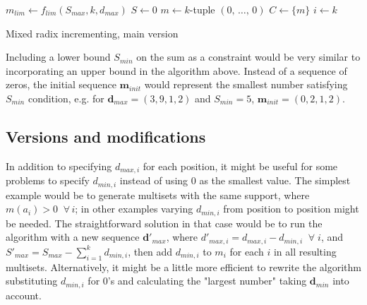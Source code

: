 \documentclass[11pt]{article}
\begin{document}
\begin{algorithm}[H]

  \BlankLine
  $m_{lim} \gets f_{lim}(S_{max}, k, d_{max})$\;
  $S \gets 0$\;
  $m \gets k$-tuple $(0, \, \dotsc, \, 0)$\;
  $C \gets \{m\}$
  $i \gets k$\;
  \caption{Mixed radix incrementing, main version}
\end{algorithm}  

\vspace{5mm}
Including a lower bound $S_{min}$ on the sum as a constraint would be very similar to incorporating an upper bound in the algorithm above. Instead of a sequence of zeros, the initial sequence $\boldsymbol{m}_{init}$ would represent the smallest number satisfying $S_{min}$ condition, e.g. for $\boldsymbol{d}_{max} = (3, 9, 1, 2)$ and $S_{min} = 5$, $\boldsymbol{m}_{init} = (0, 2, 1, 2)$. 

\subsection{Versions and modifications} \label{sec:mod}

In addition to specifying $d_{max, i}$ for each position, it might be useful for some problems to specify $d_{min, i}$ instead of using $0$ as the smallest value. The simplest example would be to generate multisets with the same support, where $m(a_i) > 0 \;\; \forall \, i$; in other examples varying $d_{min, i}$ from position to position might be needed. The straightforward solution in that case would be to run the algorithm with a new sequence $\boldsymbol{d}'_{max}$, where $d'_{max, i} = d_{max, i} - d_{min, i} \;\; \forall \; i$, and $S'_{max} = S_{max} - \sum_{i = 1}^k d_{min, i}$, then add $d_{min, i}$ to $m_i$ for each $i$ in all resulting multisets. Alternatively, it might be a little more efficient to rewrite the algorithm substituting $d_{min, i}$ for $0$'s and calculating the "largest number" taking $\boldsymbol{d}_{min}$ into account. \\
\end{document}
